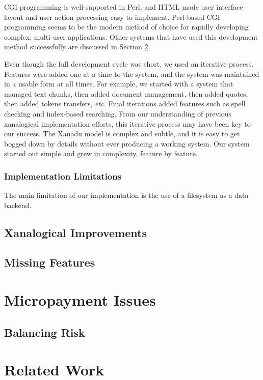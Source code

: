 \documentclass{acm_proc_article-sp}
\begin{document}
CGI programming is well-supported in Perl, and HTML made user interface layout and user action processing easy to implement.
Perl-based CGI programming seems to be the modern method of choice for rapidly developing complex, multi-user applications.
Other systems that have used this development method successfully are discussed in Section \ref{sec:RelatedWork}.

Even though the full development cycle was short, we used an iterative process.
Features were added one at a time to the system, and the system was maintained in a usable form at all times.
For example, we started with a system that managed text chunks, then added document management, then added quotes, then added tokens transfers, {\it etc.}
Final iterations added features such as spell checking and index-based searching.
From our understanding of previous xanalogical implementation efforts, this iterative process may have been key to our success.
The Xanadu model is complex and subtle, and it is easy to get bogged down by details without ever producing a working system.
Our system started out simple and grew in complexity, feature by feature.


\subsubsection{Implementation Limitations}
The main limitation of our implementation is the use of a filesystem as a data backend.


\subsection{Xanalogical Improvements}


\subsection{Missing Features}



\section{Micropayment Issues}


\subsection{Balancing Risk}



\section{Related Work}
\label{sec:RelatedWork}
\end{document}
